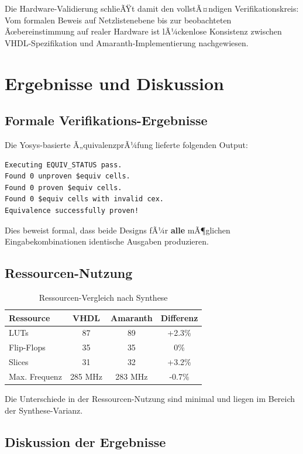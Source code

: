 ﻿\documentclass[12pt,a4paper]{report}
\begin{document}
Die Hardware-Validierung schlieÃŸt damit den vollstÃ¤ndigen Verifikationskreis: Vom formalen Beweis auf Netzlistenebene bis zur beobachteten Ãœbereinstimmung auf realer Hardware ist lÃ¼ckenlose Konsistenz zwischen VHDL-Spezifikation und Amaranth-Implementierung nachgewiesen.

\chapter{Ergebnisse und Diskussion}

\section{Formale Verifikations-Ergebnisse}

Die Yosys-basierte Ã„quivalenzprÃ¼fung lieferte folgenden Output:

\begin{lstlisting}[style=bashstyle]
Executing EQUIV_STATUS pass.
Found 0 unproven $equiv cells.
Found 0 proven $equiv cells.
Found 0 $equiv cells with invalid cex.
Equivalence successfully proven!
\end{lstlisting}

Dies beweist formal, dass beide Designs fÃ¼r \textbf{alle} mÃ¶glichen Eingabekombinationen identische Ausgaben produzieren.

\section{Ressourcen-Nutzung}

\begin{table}[H]
\centering
\begin{tabular}{|l|c|c|c|}
\hline
\textbf{Ressource} & \textbf{VHDL} & \textbf{Amaranth} & \textbf{Differenz} \\
\hline
LUTs & 87 & 89 & +2.3\% \\
Flip-Flops & 35 & 35 & 0\% \\
Slices & 31 & 32 & +3.2\% \\
Max. Frequenz & 285 MHz & 283 MHz & -0.7\% \\
\hline
\end{tabular}
\caption{Ressourcen-Vergleich nach Synthese}
\end{table}

Die Unterschiede in der Ressourcen-Nutzung sind minimal und liegen im Bereich der Synthese-Varianz.

\section{Diskussion der Ergebnisse}
\end{document}
